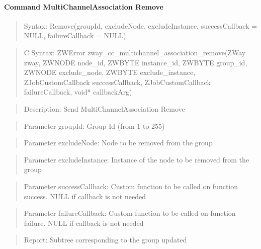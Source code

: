 \paragraph{Command MultiChannelAssociation Remove}
\begin{quote}Syntax: Remove(groupId, excludeNode, excludeInstance, successCallback = NULL, failureCallback = NULL)\end{quote}
\begin{quote}C Syntax: ZWError zway\_cc\_multichannel\_association\_remove(ZWay zway, ZWNODE node\_id, ZWBYTE instance\_id, ZWBYTE group\_id, ZWNODE exclude\_node, ZWBYTE exclude\_instance, ZJobCustomCallback successCallback, ZJobCustomCallback failureCallback, void* callbackArg)\end{quote}
\begin{quote}Description: Send MultiChannelAssociation Remove\end{quote}
\begin{quote}Parameter groupId: Group Id (from 1 to 255)\end{quote}
\begin{quote}Parameter excludeNode: Node to be removed from the group\end{quote}
\begin{quote}Parameter excludeInstance: Instance of the node to be removed from the group\end{quote}
\begin{quote}Parameter successCallback: Custom function to be called on function success. NULL if callback is not needed\end{quote}
\begin{quote}Parameter failureCallback: Custom function to be called on function failure. NULL if callback is not needed\end{quote}
\begin{quote}Report: Subtree corresponding to the group updated\end{quote}

